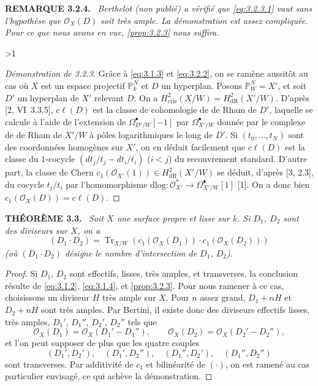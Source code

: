 \documentclass[10pt]{article}
\makeatletter
\DeclareMathOperator{\Tr}{Tr}
\newcommand{\cris}{\mathrm{cris}}
\newcommand{\dlog}{\mathrm{dlog}}
\newcommand{\sourceanchor}[2]{\begingroup\def\@currentlabel{#2}\label{#1}\endgroup}
\newenvironment{sourcestatement}[3]{\par\smallskip\noindent\textbf{#1 #2.}\sourceanchor{#3}{#2}\ \itshape}{\par\normalfont\smallskip}
\newcommand{\DPage}[2]{\ifnum#1>1\clearpage\fi\setcounter{page}{#2}}
\makeatother
\begin{document}
\begin{sourcestatement}{REMARQUE}{3.2.4}{rem:3.2.4}
Berthelot (non publié) a vérifié que \eqref{eq:3.2.3.1} vaut sans l'hypothèse que $\mathcal{O}_X(D)$ soit très ample. La démonstration est assez compliquée. Pour ce que nous avons en vue, \ref{prop:3.2.3} nous suffira.
\end{sourcestatement}

\DPage{20}{77}
\begin{proof}[Démonstration de 3.2.3]
Grâce à \eqref{eq:3.1.3} et \eqref{eq:3.2.2}, on se ramène aussitôt au cas où $X$ est un espace projectif $\mathbb{P}^N_k$ et $D$ un hyperplan. Posons $\mathbb{P}^N_W = X'$, et soit $D'$ un hyperplan de $X'$ relevant $D$. On a $H^2_{\cris}(X/W) = H^2_{\mathrm{dR}}(X'/W)$. D'après [2, VI~3.3.5], $c\ell(D)$ est la classe de cohomologie de de Rham de $D'$, laquelle se calcule à l'aide de l'extension de $\Omega^{\bullet}_{D'/W}[-1]$ par $\Omega^{\bullet}_{X'/W}$ donnée par le complexe de de Rham de $X'/W$ à pôles logarithmiques le long de $D'$. Si $(t_0, \ldots, t_N)$ sont des coordonnées homogènes sur $X'$, on en déduit facilement que $c\ell(D)$ est la classe du $1$-cocycle $(dt_j/t_j - dt_i/t_i)$ ($i < j$) du recouvrement standard. D'autre part, la classe de Chern $c_1(\mathcal{O}_{X'}(1)) \in H^2_{\mathrm{dR}}(X'/W)$ se déduit, d'après [3, 2.3], du cocycle $t_j/t_i$ par l'homomorphisme $\dlog: \mathcal{O}_{X'}^* \to \Omega^{\bullet}_{X'/W}[1]$ [1]. On a donc bien $c_1(\mathcal{O}_X(D)) = c\ell(D)$.
\end{proof}

\begin{sourcestatement}{THÉORÈME}{3.3}{thm:3.3}
Soit $X$ une surface propre et lisse sur $k$. Si $D_1$, $D_2$ sont des diviseurs sur $X$, on a
\[
(D_1 \cdot D_2) = \Tr_{X/W}(c_1(\mathcal{O}_X(D_1)) \cdot c_1(\mathcal{O}_X(D_2)))
\]
(où $(D_1 \cdot D_2)$ désigne le nombre d'intersection de $D_1$, $D_2$).
\end{sourcestatement}

\begin{proof}
Si $D_1$, $D_2$ sont effectifs, lisses, très amples, et transverses, la conclusion résulte de \eqref{eq:3.1.2}, \eqref{eq:3.1.4}, et \ref{prop:3.2.3}. Pour nous ramener à ce cas, choisissons un diviseur $H$ très ample sur $X$. Pour $n$ assez grand, $D_1 + nH$ et $D_2 + nH$ sont très amples. Par Bertini, il existe donc des diviseurs effectifs lisses, très amples, $D_1'$, $D_1''$, $D_2'$, $D_2''$ tels que
\[
\mathcal O_X(D_1)=\mathcal O_X(D_1'-D_1''),\qquad
\mathcal O_X(D_2)=\mathcal O_X(D_2'-D_2''),
\]
et l'on peut supposer de plus que les quatre couples
\[
(D_1',D_2'),\quad(D_1',D_2''),\quad(D_1'',D_2'),\quad(D_1'',D_2'')
\]
sont transverses. Par additivité de $c_1$ et bilinéarité de $(\cdot)$, on est ramené au cas particulier envisagé, ce qui achève la démonstration.
\end{proof}
\end{document}
